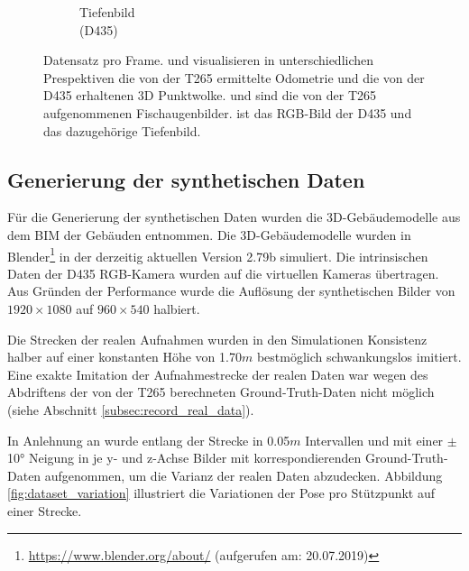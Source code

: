 \begin{figure}
\begin{subfigure}[t]{0.3\linewidth}
		\caption{Tiefenbild \\ (D435) \hspace*{2cm}}
		\label{subfig:depth-image}
	\end{subfigure}
	\caption{Datensatz pro Frame.   und  visualisieren in unterschiedlichen Prespektiven die von der T265 ermittelte Odometrie und die von der D435 erhaltenen 3D Punktwolke.  und  sind die von der T265 aufgenommenen Fischaugenbilder.  ist das RGB-Bild der D435 und  das dazugehörige Tiefenbild. }
	\label{fig:dataset}
\end{figure}

\subsection{Generierung der synthetischen Daten}
\label{subsec:generate_synth_images}
Für die Generierung der synthetischen Daten wurden die 3D-Gebäudemodelle  aus dem BIM der Gebäuden entnommen. Die 3D-Gebäudemodelle wurden in Blender\footnote{\url{https://www.blender.org/about/} (aufgerufen am: 20.07.2019)} in der derzeitig aktuellen Version 2.79b simuliert. Die intrinsischen Daten der D435 RGB-Kamera wurden auf die virtuellen Kameras übertragen. Aus Gründen der Performance wurde die Auflösung der synthetischen Bilder von $1920\times1080$ auf  $960\times540$ halbiert.

Die Strecken der realen Aufnahmen wurden in den Simulationen Konsistenz halber auf einer konstanten Höhe von 1.70$m$ bestmöglich schwankungslos imitiert. Eine exakte Imitation der Aufnahmestrecke der realen Daten war wegen des Abdriftens der von der T265 berechneten Ground-Truth-Daten nicht möglich (siehe Abschnitt \ref{subsec:record_real_data}).

In Anlehnung an \citet{acharyaBIMPoseNetIndoorCamera2019} wurde entlang der Strecke in 0.05$m$ Intervallen und mit einer $\pm$10° Neigung in je y- und z-Achse Bilder mit korrespondierenden Ground-Truth-Daten aufgenommen, um die Varianz der realen Daten abzudecken. Abbildung \ref{fig:dataset_variation} illustriert die Variationen der Pose pro Stützpunkt auf einer Strecke.


